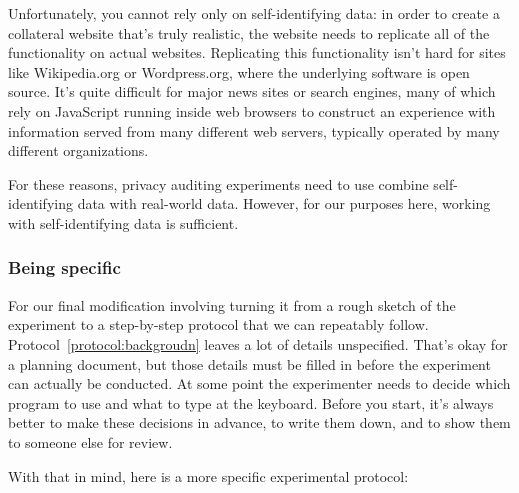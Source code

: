 Unfortunately, you cannot rely only on self-identifying data: in order
to create a collateral website that's truly realistic, the website
needs to replicate all of the functionality on actual
websites. Replicating this functionality isn't hard for sites like
Wikipedia.org or Wordpress.org, where the underlying software is open
source. It's quite difficult for major news sites or search engines,
many of which rely on JavaScript running inside web browsers to
construct an experience with information served from many different
web servers, typically operated by many different organizations.

For these reasons, privacy auditing experiments need to use combine
self-identifying data with real-world data. However, for our purposes
here, working with self-identifying data is sufficient.

\subsubsection{Being specific}
For our final modification involving turning it from a rough sketch of
the experiment to a step-by-step protocol that we can repeatably
follow. Protocol~\ref{protocol:backgroudn} leaves a lot of details
unspecified. That's okay for a planning document, but those details
must be filled in before the experiment can actually be
conducted. At some point the experimenter needs to decide which
program to use and what to type at the keyboard. Before you start, it's always 
better to make these decisions in advance, to write them down, and to
show them to someone else for review.

With that in mind, here is a more specific experimental protocol:

